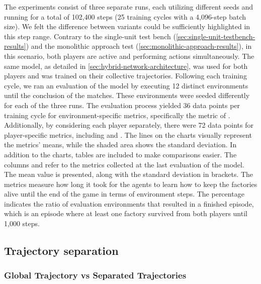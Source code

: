 \noindent The experiments consist of three separate runs, each utilizing different seeds and running for a total of 102,400 steps (25 training cycles with a 4,096-step batch size). We felt the difference between variants could be sufficiently highlighted in this step range. Contrary to the single-unit test bench (\autoref{sec:single-unit-testbench-results}) and the monolithic approach test (\autoref{sec:monolithic-approach-results}), in this scenario, both players are active and performing actions simultaneously. The same model, as detailed in \autoref{sec:hybrid-network-architecture}, was used for both players and was trained on their collective trajectories. Following each training cycle, we ran an evaluation of the model by executing 12 distinct environments until the conclusion of the matches. These environments were seeded differently for each of the three runs. The evaluation process yielded 36 data points per training cycle for environment-specific metrics, specifically the metric of . Additionally, by considering each player separately, there were 72 data points for player-specific metrics, including  and . The lines on the charts visually represent the metrics' means, while the shaded area shows the standard deviation. In addition to the charts, tables are included to make comparisons easier. The columns  and  refer to the metrics collected at the last evaluation of the model. The mean value is presented, along with the standard deviation in brackets. The  metrics measure how long it took for the agents to learn how to keep the factories alive until the end of the game in terms of environment steps. The percentage indicates the ratio of evaluation environments that resulted in a finished episode, which is an episode where at least one factory survived from both players until 1,000 steps.

\subsection{Trajectory separation} \label{sec:trajectory-separation}

\subsubsection{Global Trajectory vs Separated Trajectories}

